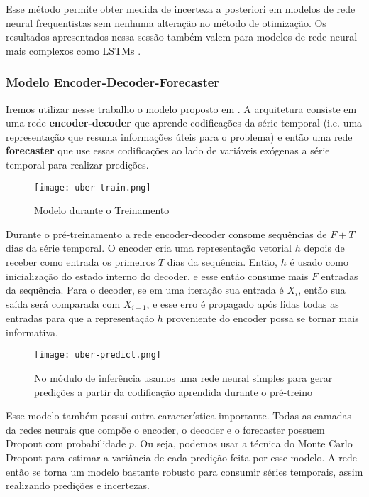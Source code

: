 Esse método permite obter medida de incerteza a posteriori em modelos de rede
neural frequentistas sem nenhuma alteração no método de otimização.
Os resultados apresentados nessa sessão também valem para modelos de rede neural
mais complexos como LSTMs \citep{dropbayes}.
 
\subsubsection{Modelo Encoder-Decoder-Forecaster}

Iremos utilizar nesse trabalho o modelo proposto em \citep{ubertime}. A
arquitetura consiste em uma rede \textbf{encoder-decoder} que aprende codificações da
série temporal (i.e. uma representação que resuma informações úteis para o
problema) e então uma rede \textbf{forecaster} que use essas codificações ao lado de
variáveis exógenas a série temporal para realizar predições.  \\ 



\begin{figure}[H]
\centering
\texttt{[image: uber-train.png]}
\caption{Modelo durante o Treinamento \citep{ubertime}}
\label{img:uber1}
\end{figure}


Durante o pré-treinamento a rede encoder-decoder consome sequências de $F + T$ dias
da série temporal. O encoder cria uma representação vetorial $h$ depois de
receber como entrada os primeiros $T$ dias da sequência. Então, $h$ é usado como
inicialização do estado interno do decoder, e esse então consume mais $F$
entradas da sequência. Para o decoder, se em uma iteração sua entrada é $X_i$,
então sua saída será comparada com $X_{i+1}$, e esse erro é propagado após lidas
todas as entradas para que a representação $h$ proveniente do encoder possa se
tornar mais informativa. \\


\begin{figure}[H]
  \centering
  \texttt{[image: uber-predict.png]}
  \caption{No módulo de inferência usamos uma rede neural simples para gerar
    predições a partir da codificação aprendida durante o pré-treino \citep{ubertime}}
  \label{img:uber2}
\end{figure}




Esse modelo também possui outra característica importante. Todas as camadas da
redes neurais que compõe o encoder, o decoder e o forecaster possuem
Dropout com probabilidade $p$. Ou seja, podemos usar a técnica do Monte
Carlo Dropout para estimar a variância de cada predição feita por esse modelo. A
rede então se torna um modelo bastante robusto para consumir séries temporais,
assim realizando predições e incertezas.\\


